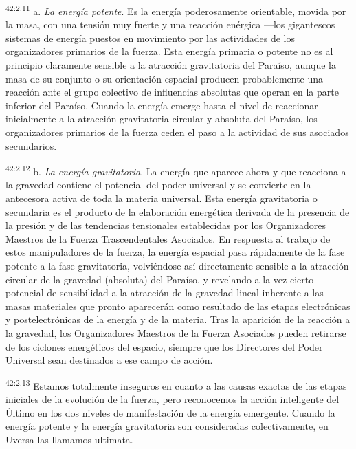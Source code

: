 \par
\textsuperscript{42:2.11} a. \textit{La energía potente}. Es la energía poderosamente orientable, movida por la masa, con una tensión muy fuerte y una reacción enérgica ---los gigantescos sistemas de energía puestos en movimiento por las actividades de los organizadores primarios de la fuerza. Esta energía primaria o potente no es al principio claramente sensible a la atracción gravitatoria del Paraíso, aunque la masa de su conjunto o su orientación espacial producen probablemente una reacción ante el grupo colectivo de influencias absolutas que operan en la parte inferior del Paraíso. Cuando la energía emerge hasta el nivel de reaccionar inicialmente a la atracción gravitatoria circular y absoluta del Paraíso, los organizadores primarios de la fuerza ceden el paso a la actividad de sus asociados secundarios.

\par
\textsuperscript{42:2.12} b. \textit{La energía gravitatoria}. La energía que aparece ahora y que reacciona a la gravedad contiene el potencial del poder universal y se convierte en la antecesora activa de toda la materia universal. Esta energía gravitatoria o secundaria es el producto de la elaboración energética derivada de la presencia de la presión y de las tendencias tensionales establecidas por los Organizadores Maestros de la Fuerza Trascendentales Asociados. En respuesta al trabajo de estos manipuladores de la fuerza, la energía espacial pasa rápidamente de la fase potente a la fase gravitatoria, volviéndose así directamente sensible a la atracción circular de la gravedad (absoluta) del Paraíso, y revelando a la vez cierto potencial de sensibilidad a la atracción de la gravedad lineal inherente a las masas materiales que pronto aparecerán como resultado de las etapas electrónicas y postelectrónicas de la energía y de la materia. Tras la aparición de la reacción a la gravedad, los Organizadores Maestros de la Fuerza Asociados pueden retirarse de los ciclones energéticos del espacio, siempre que los Directores del Poder Universal sean destinados a ese campo de acción.

\par
\textsuperscript{42:2.13} Estamos totalmente inseguros en cuanto a las causas exactas de las etapas iniciales de la evolución de la fuerza, pero reconocemos la acción inteligente del Último en los dos niveles de manifestación de la energía emergente. Cuando la energía potente y la energía gravitatoria son consideradas colectivamente, en Uversa las llamamos ultimata.

